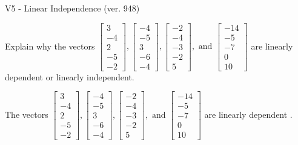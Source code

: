 \begin{exercise}
  \begin{exerciseTitle}V5 - Linear Independence (ver. 948)\end{exerciseTitle}
  \begin{exerciseStatement}
    Explain why the vectors \(\left[\begin{array}{r}
3 \\
-4 \\
2 \\
-5 \\
-2
\end{array}\right] , \left[\begin{array}{r}
-4 \\
-5 \\
3 \\
-6 \\
-4
\end{array}\right] , \left[\begin{array}{r}
-2 \\
-4 \\
-3 \\
-2 \\
5
\end{array}\right] , \text{ and } \left[\begin{array}{r}
-14 \\
-5 \\
-7 \\
0 \\
10
\end{array}\right]\) are linearly dependent or linearly independent.	


  \end{exerciseStatement}
  \begin{exerciseAnswer}
   The vectors \(\left[\begin{array}{r}
3 \\
-4 \\
2 \\
-5 \\
-2
\end{array}\right] , \left[\begin{array}{r}
-4 \\
-5 \\
3 \\
-6 \\
-4
\end{array}\right] , \left[\begin{array}{r}
-2 \\
-4 \\
-3 \\
-2 \\
5
\end{array}\right] , \text{ and } \left[\begin{array}{r}
-14 \\
-5 \\
-7 \\
0 \\
10
\end{array}\right]\) are 
  	 linearly dependent  .
  


  \end{exerciseAnswer}
\end{exercise}